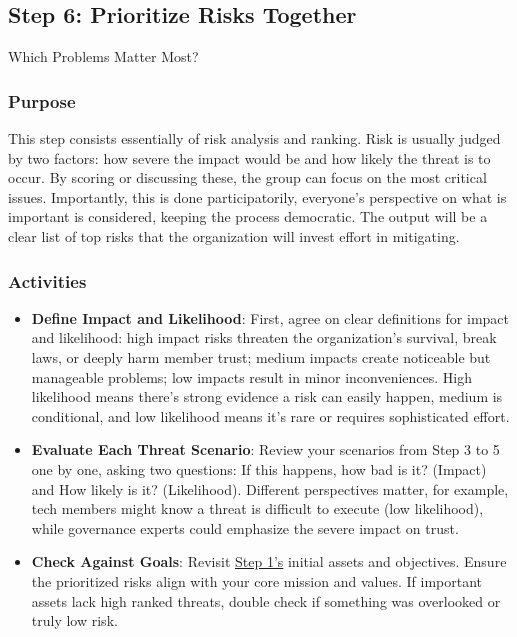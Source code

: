 \subsection{Step 6: Prioritize Risks Together}
\label{subsec:Step6}

Which Problems Matter Most?

\subsubsection{Purpose}

This step consists essentially of risk analysis and ranking. Risk is usually judged by two factors:
how severe the impact would be and how likely the threat is to occur. By scoring
or discussing these, the group can focus on the most critical issues.
Importantly, this is done participatorily, everyone's perspective on what is
important is considered, keeping the process democratic. The output will be a
clear list of top risks that the organization will invest effort in mitigating.

\subsubsection{Activities}

\begin{itemize}

    \item \textbf{Define Impact and Likelihood}: First, agree on clear
    definitions for impact and likelihood: high impact risks threaten the
    organization's survival, break laws, or deeply harm member trust; medium impacts
    create noticeable but manageable problems; low impacts result in minor
    inconveniences. High likelihood means there's strong evidence a risk can easily
    happen, medium is conditional, and low likelihood means it's rare or requires
    sophisticated effort.
    
    \item \textbf{Evaluate Each Threat Scenario}: Review your scenarios from Step 3 to 5 one by one,
    asking two questions: If this happens, how bad is it? (Impact) and How likely
    is it? (Likelihood). Different perspectives matter, for example, tech members
    might know a threat is difficult to execute (low likelihood), while governance
    experts could emphasize the severe impact on trust.
    
    \item \textbf{Check Against Goals}: Revisit \hyperref[subsec:Step1]{Step 1's} initial assets and objectives.
    Ensure the prioritized risks align with your core mission and values. If
    important assets lack high ranked threats, double check if something was
    overlooked or truly low risk.

\end{itemize}
    
